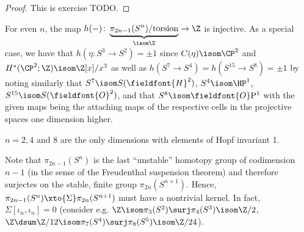 \begin{proof}
	This is exercise TODO.
\end{proof}
\begin{corollary}
	For even $n$, the map $h({{-}})\colon \underbrace{\pi_{2n - 1}(S^n) / \text{torsion}}_{\isom \Z} \to \Z$ is injective.
	As a special case, we have that $h(\eta\colon S^3 \to S^2) = \pm 1$ since $C(\eta) \isom \CP^2$ and $H^*(\CP^2; \Z) \isom \Z[x] / x^3$ as well as $h(S^7 \to S^4) = h(S^{15} \to S^8) = \pm 1$ by noting similarly that $S^7 \isom S(\fieldfont{H}^2)$, $S^4 \isom \HP^1$, $S^{15} \isom S(\fieldfont{O}^2)$, and that $S^8 \isom \fieldfont{O}\mathrm{P}^1$ with the given maps being the attaching maps of the respective cells in the projective spaces one dimension higher.
\end{corollary}
\begin{theorem}
	$n = 2, 4$ and 8 are the only dimensions with elements of Hopf invariant 1.
\end{theorem}
Note that $\pi_{2n - 1}(S^n)$ is the last \enquote{unstable} homotopy group of codimension $n - 1$ (in the sense of the Freudenthal suspension theorem) and therefore surjectes on the stable, finite group $\pi_{2n}(S^{n + 1})$.
Hence, $\pi_{2n - 1}(S^n) \xto{\Sigma} \pi_{2n}(S^{n + 1})$ must have a nontrivial kernel.
In fact, $\Sigma [\iota_n, \iota_n] = 0$ (consider e.g. $\Z \isom \pi_3(S^2) \surj \pi_4(S^3) \isom \Zn{2}$, $\Z \dsum \Zn{12} \isom \pi_7(S^4) \surj \pi_8(S^5) \isom \Zn{24}$).

